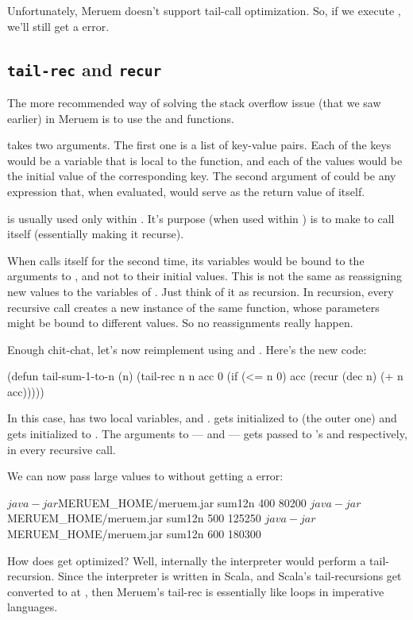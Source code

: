 Unfortunately, Meruem doesn't support tail-call optimization. So, if we execute , we'll still get a  error.

\subsection{\texttt{tail-rec} and \texttt{recur}}
The more recommended way of solving the stack overflow issue (that we saw earlier) in Meruem is to use the  and  functions. 

 takes two arguments. The first one is a list of key-value pairs. Each of the keys would be a variable that is local to the  function, and each of the values would be the initial value of the corresponding key. The second argument of  could be any expression that, when evaluated, would serve as the return value of  itself.

 is usually used only within . It's purpose (when used within ) is to make  to call itself (essentially making it recurse). 

When  calls itself for the second time, its variables would be bound to the arguments to , and not to their initial values. This is not the same as reassigning new values to the variables of . Just think of it as recursion. In recursion, every recursive call creates a new instance of the same function, whose parameters might be bound to different values. So no reassignments really happen.

Enough chit-chat, let's now reimplement  using  and . Here's the new code:

\begin{Meruem}
(defun tail-sum-1-to-n (n)
  (tail-rec { n n acc 0 }
    (if (<= n 0)
      acc
      (recur (dec n) (+ n acc)))))
\end{Meruem}

In this case,  has two local variables,  and .  gets initialized to  (the outer one) and  gets initialized to . The arguments to  ---  and  --- gets passed to 's  and  respectively, in every recursive call.

We can now pass large values to  without getting a  error:

\begin{REPL}
$ java -jar $MERUEM_HOME/meruem.jar sum12n 400
80200
$ java -jar $MERUEM_HOME/meruem.jar sum12n 500
125250
$ java -jar $MERUEM_HOME/meruem.jar sum12n 600
180300
\end{REPL}

How does  get optimized? Well, internally the interpreter would perform a tail-recursion. Since the interpreter is written in Scala, and Scala's tail-recursions get converted to  at , then Meruem's tail-rec is essentially like loops in imperative languages.